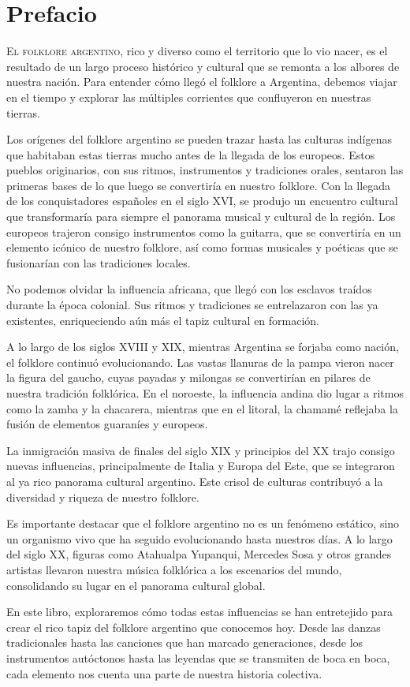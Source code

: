 \chapter{Prefacio}

\lettrine{E}{l folklore argentino}, rico y diverso como el territorio que lo vio nacer, es el resultado de un largo proceso histórico y cultural que se remonta a los albores de nuestra nación. Para entender cómo llegó el folklore a Argentina, debemos viajar en el tiempo y explorar las múltiples corrientes que confluyeron en nuestras tierras.

Los orígenes del folklore argentino se pueden trazar hasta las culturas indígenas que habitaban estas tierras mucho antes de la llegada de los europeos. Estos pueblos originarios, con sus ritmos, instrumentos y tradiciones orales, sentaron las primeras bases de lo que luego se convertiría en nuestro folklore.
Con la llegada de los conquistadores españoles en el siglo XVI, se produjo un encuentro cultural que transformaría para siempre el panorama musical y cultural de la región. Los europeos trajeron consigo instrumentos como la guitarra, que se convertiría en un elemento icónico de nuestro folklore, así como formas musicales y poéticas que se fusionarían con las tradiciones locales.

No podemos olvidar la influencia africana, que llegó con los esclavos traídos durante la época colonial. Sus ritmos y tradiciones se entrelazaron con las ya existentes, enriqueciendo aún más el tapiz cultural en formación.

A lo largo de los siglos XVIII y XIX, mientras Argentina se forjaba como nación, el folklore continuó evolucionando. Las vastas llanuras de la pampa vieron nacer la figura del gaucho, cuyas payadas y milongas se convertirían en pilares de nuestra tradición folklórica. En el noroeste, la influencia andina dio lugar a ritmos como la zamba y la chacarera, mientras que en el litoral, la chamamé reflejaba la fusión de elementos guaraníes y europeos.

La inmigración masiva de finales del siglo XIX y principios del XX trajo consigo nuevas influencias, principalmente de Italia y Europa del Este, que se integraron al ya rico panorama cultural argentino. Este crisol de culturas contribuyó a la diversidad y riqueza de nuestro folklore.

Es importante destacar que el folklore argentino no es un fenómeno estático, sino un organismo vivo que ha seguido evolucionando hasta nuestros días. A lo largo del siglo XX, figuras como Atahualpa Yupanqui, Mercedes Sosa y otros grandes artistas llevaron nuestra música folklórica a los escenarios del mundo, consolidando su lugar en el panorama cultural global.

En este libro, exploraremos cómo todas estas influencias se han entretejido para crear el rico tapiz del folklore argentino que conocemos hoy. Desde las danzas tradicionales hasta las canciones que han marcado generaciones, desde los instrumentos autóctonos hasta las leyendas que se transmiten de boca en boca, cada elemento nos cuenta una parte de nuestra historia colectiva.
\cleardoublepage   %